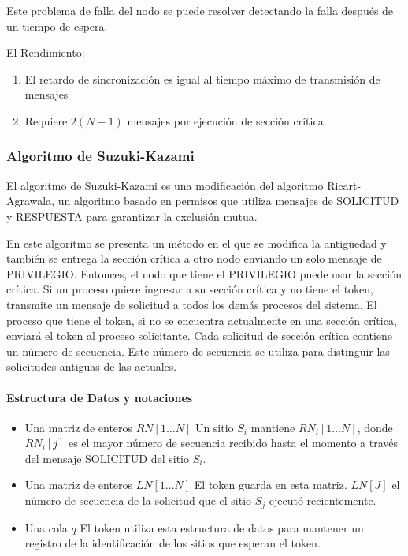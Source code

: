 {Este  problema de falla del nodo se puede 	resolver detectando la falla después de un 	tiempo de espera.

El Rendimiento:
	\begin{enumerate}
		\item El retardo de sincronización es igual al
		tiempo máximo de transmisión de mensajes
		
		\item 	Requiere $2 (N - 1)$ mensajes por ejecución
		de sección crítica.
	\end{enumerate}
	
	\subsubsection{Algoritmo de Suzuki-Kazami}
	
	El algoritmo de Suzuki-Kazami  es una modificación del algoritmo Ricart-Agrawala, un algoritmo basado en permisos   que utiliza mensajes de SOLICITUD y RESPUESTA para garantizar la exclusión mutua.
	
	En este algoritmo se presenta un método en el que se modifica la antigüedad y también se entrega la sección crítica a otro nodo enviando un solo mensaje de PRIVILEGIO. Entonces, el nodo que tiene el PRIVILEGIO puede usar la sección crítica. Si un proceso quiere ingresar a su sección crítica y no tiene el token, transmite un mensaje de solicitud a todos los demás procesos del sistema. El proceso que tiene el token, si no se encuentra actualmente en una sección crítica, enviará el token al proceso solicitante. 	Cada solicitud de sección crítica contiene un número de secuencia. Este número de secuencia se utiliza para distinguir las solicitudes antiguas de las actuales.
	
	\paragraph{Estructura de Datos y notaciones}
	\begin{itemize}
		\item 	Una matriz de enteros $RN[1…N]$
		Un sitio $S_{i}$ mantiene $RN_{i}[1…N]$, donde $RN_{i}[j]$ es el mayor número de secuencia recibido hasta el momento a través del mensaje SOLICITUD del sitio $S_{i}$.
		\item Una matriz de enteros $LN[1…N]$
		El token guarda en esta matriz. $LN[J]$ el número de secuencia de la solicitud que el sitio $S_{j}$ ejecutó recientemente.
		\item Una cola $q$
		El token utiliza esta estructura de datos para mantener un registro de la identificación de los sitios que esperan el token.
	\end{itemize}
	
}

